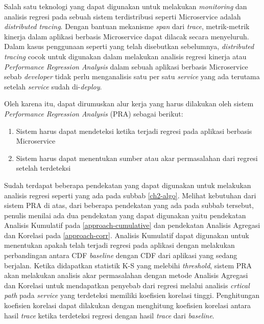 Salah satu teknologi yang dapat digunakan untuk melakukan \textit{monitoring} dan analisis regresi pada sebuah sistem terdistribusi seperti Microservice adalah \textit{distributed tracing}. Dengan bantuan mekanisme \textit{span} dari \textit{trace}, metrik-metrik kinerja dalam aplikasi berbasis Microservice dapat dilacak secara menyeluruh. Dalam kasus penggunaan seperti yang telah disebutkan sebelumnya, \textit{distributed tracing} cocok untuk digunakan dalam melakukan analisis regresi kinerja atau \textit{Performance Regression Analysis} dalam sebuah aplikasi berbasis Microservice sebab \textit{developer} tidak perlu menganalisis satu per satu \textit{service} yang ada terutama setelah \textit{service} sudah di-\textit{deploy}.


Oleh karena itu, dapat dirumuskan alur kerja yang harus dilakukan oleh sistem \textit{Performance Regression Analysis} (PRA) sebagai berikut:
\begin{enumerate}
	\item Sistem harus dapat mendeteksi ketika terjadi regresi pada aplikasi berbasis Microservice
	\item Sistem harus dapat menentukan sumber atau akar permasalahan dari regresi setelah terdeteksi
\end{enumerate}



Sudah terdapat beberapa pendekatan yang dapat digunakan untuk melakukan analisis regresi seperti yang ada pada subbab \ref{ch2-algo}. Melihat kebutuhan dari sistem PRA di atas, dari beberapa pendekatan yang ada pada subbab tersebut, penulis menilai ada dua pendekatan yang dapat digunakan yaitu pendekatan Analisis Kumulatif pada \ref{approach-cumulative} dan pendekatan Analisis Agregasi dan Korelasi pada \ref{approach-corr}. Analisis Kumulatif dapat digunakan untuk menentukan apakah telah terjadi regresi pada aplikasi dengan melakukan perbandingan antara CDF \textit{baseline} dengan CDF dari aplikasi yang sedang berjalan. Ketika didapatkan statistik K-S yang melebihi \textit{threshold}, sistem PRA akan melakukan analisis akar permasalahan dengan metode Analisis Agregasi dan Korelasi untuk mendapatkan penyebab dari regresi melalui analisis \textit{crtical path} pada \textit{service} yang terdeteksi memiliki koefisien korelasi tinggi. Penghitungan koefisien korelasi dapat dilakukan dengan menghitung koefisien korelasi antara hasil \textit{trace} ketika terdeteksi regresi dengan hasil \textit{trace} dari \textit{baseline}.

